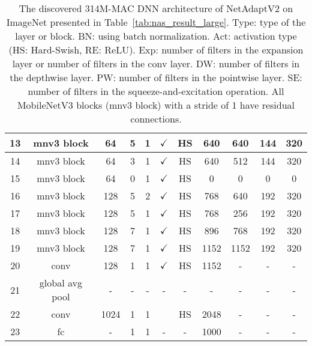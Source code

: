 \begin{table*}[t]
\begin{tabular}{c|c|c|c|c|c|c|c|c|c|c}
13    & mnv3 block      & 64   & 5                                                     & 1      & $\checkmark$ & HS  & 640  & 640  & 144   & 320 \\ \hline
14     & mnv3 block      & 64   & 3                                                     & 1      & $\checkmark$ & HS  & 640  & 512   & 144   & 320  \\ \hline
15    & mnv3 block      & 64   & 0                                                     & 1      & $\checkmark$ & HS  & 0  & 0  & 0  & 0 \\ \hline

16    & mnv3 block      & 128  & 5                                                     & 2      & $\checkmark$ & HS  & 768  & 640  & 192  & 320 \\ \hline
17    & mnv3 block      & 128  & 5                                                     & 1      & $\checkmark$ & HS  & 768  & 256  & 192  & 320 \\ \hline
18    & mnv3 block      & 128  & 7                                                     & 1      & $\checkmark$ & HS  & 896  & 768  & 192  & 320 \\ \hline
19    & mnv3 block      & 128  & 7                                                     & 1      & $\checkmark$ & HS  & 1152  & 1152  & 192  & 320 \\ \hline

20    & conv            & 128  & 1                                                     & 1      & $\checkmark$ & HS  & 1152 & -    & -    & -   \\ \hline

21    & global avg pool & -    & -                                                     & -      & -            & -   & -    & -    & -    & -   \\ \hline
22    & conv            & 1024 & 1                                                     & 1      &              & HS  & 2048 & -    & -    & -   \\ \hline
23    & fc              & -    & 1                                                     & 1      & -            & -   & 1000 & -    & -    & -   \\ \toprule
\end{tabular}
\caption{The discovered 314M-MAC DNN architecture of NetAdaptV2 on ImageNet presented in Table~\ref{tab:nas_result_large}. Type: type of the layer or block. BN: using batch normalization. Act: activation type (HS: Hard-Swish, RE: ReLU). Exp: number of filters in the expansion layer or number of filters in the conv layer. DW: number of filters in the depthwise layer. PW: number of filters in the pointwise layer. SE: number of filters in the squeeze-and-excitation operation. All MobileNetV3 blocks (mnv3 block) with a stride of 1 have residual connections.}
\label{tab:discovered_architecture_mac}
\end{table*}


